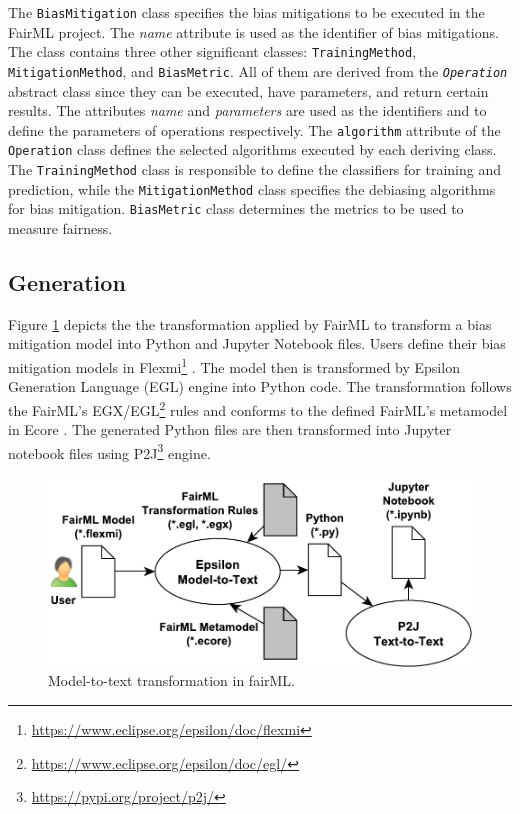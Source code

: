 \documentclass[sigconf,review]{acmart}
\begin{document}
	The \texttt{BiasMitigation} class specifies the bias mitigations to be executed in the FairML project. The \textit{name} attribute is used as the identifier of bias mitigations. The class contains three other significant classes: \texttt{TrainingMethod}, \texttt{MitigationMethod}, and \texttt{BiasMetric}. All of them are derived from the \texttt{\textit{Operation}} abstract class since they can be executed, have parameters, and return certain results. The attributes \textit{name} and \textit{parameters} are used as the identifiers and to define the parameters of operations respectively. The \texttt{algorithm} attribute of the \texttt{Operation} class defines the selected algorithms executed by each deriving class. The \texttt{TrainingMethod} class is responsible to define the classifiers for training and prediction, while the \texttt{MitigationMethod} class specifies the debiasing algorithms for bias mitigation. \texttt{BiasMetric} class determines the metrics to be used to measure fairness. 
	
	
	\subsection{Generation}
	\label{sec:generation}
	
	Figure \ref{fig:transformation} depicts the the transformation applied by FairML to transform a bias mitigation model into Python and Jupyter Notebook files. Users define their bias mitigation models in Flexmi\footnote{\url{https://www.eclipse.org/epsilon/doc/flexmi}} \cite{dimitris2016flexmi}. The model then is transformed by Epsilon Generation Language (EGL) \cite{rose2008egl} engine into Python code. The transformation follows the FairML's EGX/EGL\footnote{\url{https://www.eclipse.org/epsilon/doc/egl/}} rules and conforms to the defined FairML's metamodel in Ecore \cite{steinberg2009emf}. The generated Python files are then transformed into Jupyter notebook files using P2J\footnote{\url{https://pypi.org/project/p2j/}} engine.
	
	\begin{figure}
		\includegraphics[width=\linewidth]{figures/transformation}
		\caption{Model-to-text transformation in fairML.}
		\label{fig:transformation}
	\end{figure}
	
\end{document}
